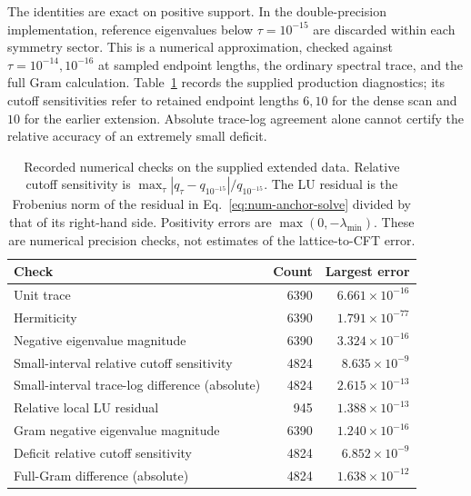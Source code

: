 The identities are exact on positive support. In the
double-precision implementation, reference eigenvalues below
$\tau=10^{-15}$ are discarded within each symmetry sector.
This is a numerical approximation, checked against
$\tau=10^{-14},10^{-16}$ at sampled endpoint lengths, the
ordinary spectral trace, and the full Gram calculation.
Table~\ref{tab:num-checks} records the supplied production
diagnostics; its cutoff sensitivities refer to retained endpoint
lengths $6,10$ for the dense scan and $10$ for the earlier
extension. Absolute trace-log agreement alone cannot certify
the relative accuracy of an extremely small deficit.
\begin{table}[htbp]\centering\small
\begin{tabular}{lrr}\toprule
Check & Count & Largest error\\\midrule
Unit trace & 6390 & $6.661\times10^{-16}$\\
Hermiticity & 6390 & $1.791\times10^{-77}$\\
Negative eigenvalue magnitude & 6390 & $3.324\times10^{-16}$\\
Small-interval relative cutoff sensitivity & 4824 & $8.635\times10^{-9}$\\
Small-interval trace-log difference (absolute) & 4824 & $2.615\times10^{-13}$\\
Relative local LU residual & 945 & $1.388\times10^{-13}$\\
Gram negative eigenvalue magnitude & 6390 & $1.240\times10^{-16}$\\
Deficit relative cutoff sensitivity & 4824 & $6.852\times10^{-9}$\\
Full-Gram difference (absolute) & 4824 & $1.638\times10^{-12}$\\\bottomrule
\end{tabular}
\caption{Recorded numerical checks on the supplied extended data.
Relative cutoff sensitivity is $\max_\tau|q_\tau-q_{10^{-15}}|/q_{10^{-15}}$.
The LU residual is the Frobenius norm of the residual in
Eq.~\eqref{eq:num-anchor-solve} divided by that of its right-hand side.
Positivity errors are $\max(0,-\lambda_{\min})$. These are numerical
precision checks, not estimates of the lattice-to-CFT error.}
\label{tab:num-checks}
\end{table}

